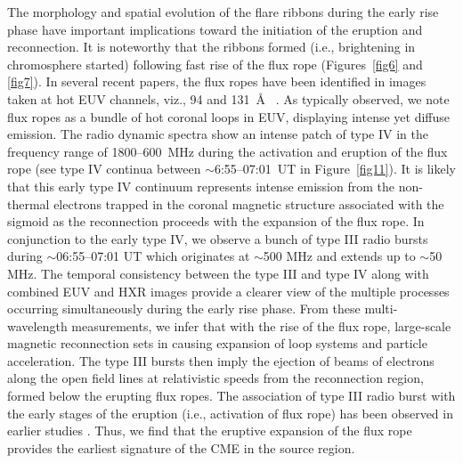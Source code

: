\documentclass[twocolumn]{aastex6}
\begin{document}
{The morphology and spatial evolution of the flare ribbons during the early rise phase have important implications toward the initiation of the eruption and reconnection. It is noteworthy that the ribbons formed (i.e., brightening in chromosphere started) following fast rise of the flux rope (Figures~\ref{fig6} and \ref{fig7}). In several recent papers, the flux ropes have been identified in images taken at hot EUV channels, viz., 94 and 131~\AA~ \citep{Cheng2011,Patsourakos2013,Kumar2014}. As typically observed, we note flux ropes as a bundle of hot coronal loops in EUV, displaying intense yet diffuse emission. The radio dynamic spectra show an intense patch of type IV in the frequency range of 1800--600~MHz during the activation and eruption of the flux rope (see type IV continua between $\sim$6:55--07:01~UT in Figure~\ref{fig11}). It is likely that this early type IV continuum represents intense emission from the non-thermal electrons trapped in the coronal magnetic structure associated with the sigmoid as the reconnection proceeds with the expansion of the flux rope. In conjunction to the early type IV, we observe a bunch of type III radio bursts during $\sim$06:55--07:01 UT which originates at $\sim$500 MHz and extends up to $\sim$50 MHz. The temporal consistency between the type III and type IV along with combined EUV and HXR images provide a clearer view of the multiple processes occurring simultaneously during the early rise phase. From these multi-wavelength measurements, we infer that with the rise of the flux rope, large-scale magnetic reconnection sets in causing expansion of loop systems and particle acceleration. The type III bursts then imply the ejection of beams of electrons along the open field lines at relativistic speeds from the reconnection region, formed below the erupting flux ropes. The association of type III radio burst with the early stages of the eruption (i.e., activation of flux rope) has been observed in earlier studies \citep[see e.g.,][]{Joshi2007}. Thus, we find that the eruptive expansion of the flux rope provides the earliest signature of the CME in the source region.

}
\end{document}
